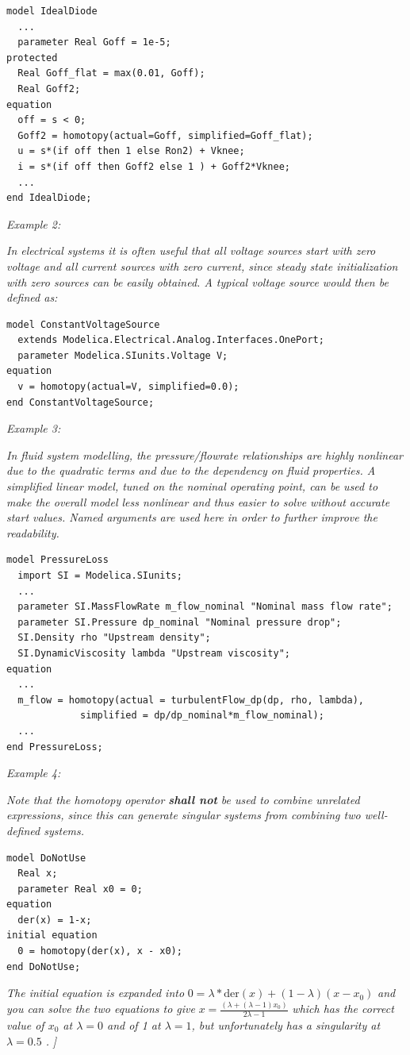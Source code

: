 \documentclass[10pt,a4paper]{report}
\begin{document}
\begin{lstlisting}[language=modelica]
model IdealDiode
  ...
  parameter Real Goff = 1e-5;
protected
  Real Goff_flat = max(0.01, Goff);
  Real Goff2;
equation
  off = s < 0;
  Goff2 = homotopy(actual=Goff, simplified=Goff_flat);
  u = s*(if off then 1 else Ron2) + Vknee;
  i = s*(if off then Goff2 else 1 ) + Goff2*Vknee;
  ...
end IdealDiode;
\end{lstlisting}
\emph{Example 2:}

\emph{In electrical systems it is often useful that all voltage sources
start with zero voltage and all current sources with zero current, since
steady state initialization with zero sources can be easily obtained. A
typical voltage source would then be defined as:}

\begin{lstlisting}[language=modelica]
model ConstantVoltageSource
  extends Modelica.Electrical.Analog.Interfaces.OnePort;
  parameter Modelica.SIunits.Voltage V;
equation
  v = homotopy(actual=V, simplified=0.0);
end ConstantVoltageSource;
\end{lstlisting}

\emph{Example 3:}

\emph{In fluid system modelling, the pressure/flowrate relationships are
highly nonlinear due to the quadratic terms and due to the dependency on
fluid properties. A simplified linear model, tuned on the nominal
operating point, can be used to make the overall model less nonlinear
and thus easier to solve without accurate start values. Named arguments
are used here in order to further improve the readability.}

\begin{lstlisting}[language=modelica]
model PressureLoss
  import SI = Modelica.SIunits;
  ...
  parameter SI.MassFlowRate m_flow_nominal "Nominal mass flow rate";
  parameter SI.Pressure dp_nominal "Nominal pressure drop";
  SI.Density rho "Upstream density";
  SI.DynamicViscosity lambda "Upstream viscosity";
equation
  ...
  m_flow = homotopy(actual = turbulentFlow_dp(dp, rho, lambda),
             simplified = dp/dp_nominal*m_flow_nominal);
  ...
end PressureLoss;
\end{lstlisting}
\emph{Example 4:}

\emph{Note that the homotopy operator \textbf{shall not} be used to
combine unrelated expressions, since this can generate singular systems
from combining two well-defined systems.}

\begin{lstlisting}[language=modelica]
model DoNotUse
  Real x;
  parameter Real x0 = 0;
equation
  der(x) = 1-x;
initial equation
  0 = homotopy(der(x), x - x0);
end DoNotUse;
\end{lstlisting}
\emph{The initial equation is expanded into}
$ 0 = \lambda*\mathrm{der}(x)+(1-\lambda)(x-x_0)$
\emph{and you can solve the two equations to give}
$ x=\frac{(\lambda+(\lambda-1)x_0)}{2\lambda-1}$
\emph{which has the correct value of $x_0$ at $\lambda = 0$ and of 1 at $\lambda= 1$, but unfortunately has a singularity at $\lambda = 0.5 $ .}
\emph{{]}}
\end{document}
